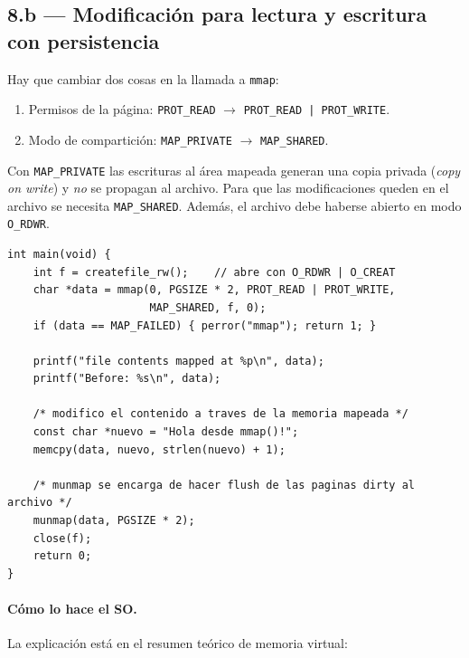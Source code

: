 \documentclass[11pt,a4paper]{article}
\begin{document}
\subsection{8.b --- Modificación para lectura y escritura con persistencia}

Hay que cambiar dos cosas en la llamada a \texttt{mmap}:

\begin{enumerate}[leftmargin=*,nosep]
    \item Permisos de la página: \verb!PROT_READ! $\to$ \verb!PROT_READ | PROT_WRITE!.
    \item Modo de compartición: \verb!MAP_PRIVATE! $\to$ \verb!MAP_SHARED!.
\end{enumerate}

\begin{importante}
Con \texttt{MAP\_PRIVATE} las escrituras al área mapeada generan una
copia privada (\emph{copy on write}) y \emph{no} se propagan al
archivo. Para que las modificaciones queden en el archivo se necesita
\texttt{MAP\_SHARED}. Además, el archivo debe haberse abierto en
modo \texttt{O\_RDWR}.
\end{importante}

\begin{lstlisting}[style=cstyle]
int main(void) {
    int f = createfile_rw();    // abre con O_RDWR | O_CREAT
    char *data = mmap(0, PGSIZE * 2, PROT_READ | PROT_WRITE,
                      MAP_SHARED, f, 0);
    if (data == MAP_FAILED) { perror("mmap"); return 1; }

    printf("file contents mapped at %p\n", data);
    printf("Before: %s\n", data);

    /* modifico el contenido a traves de la memoria mapeada */
    const char *nuevo = "Hola desde mmap()!";
    memcpy(data, nuevo, strlen(nuevo) + 1);

    /* munmap se encarga de hacer flush de las paginas dirty al archivo */
    munmap(data, PGSIZE * 2);
    close(f);
    return 0;
}
\end{lstlisting}

\paragraph{Cómo lo hace el SO.}
La explicación está en el resumen teórico de memoria virtual:
\end{document}

